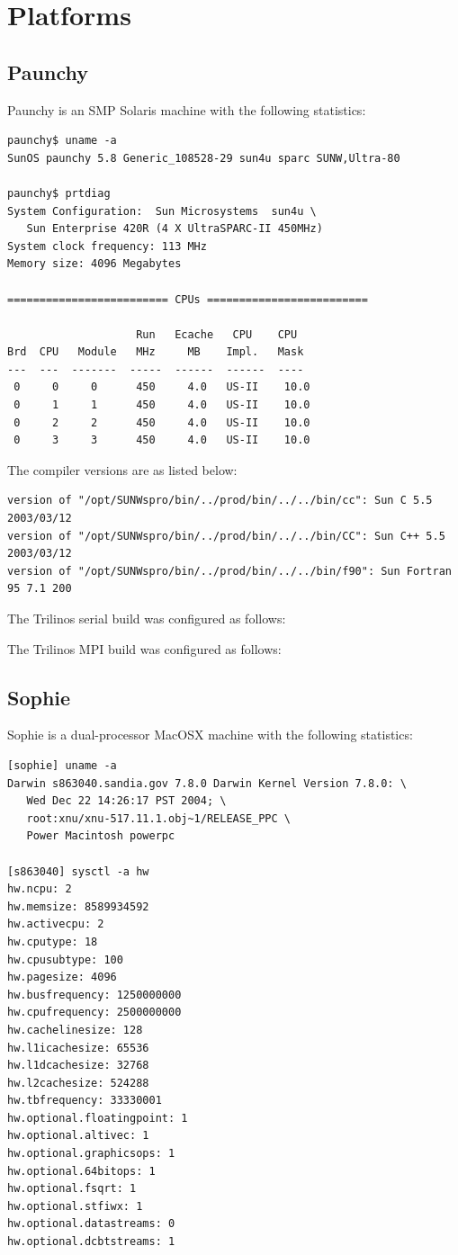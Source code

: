 \documentclass[10pt]{article}
\begin{document}
\section{Platforms}

\subsection{Paunchy}

Paunchy is an SMP Solaris machine with the following statistics:
\begin{verbatim}
paunchy$ uname -a
SunOS paunchy 5.8 Generic_108528-29 sun4u sparc SUNW,Ultra-80

paunchy$ prtdiag
System Configuration:  Sun Microsystems  sun4u \
   Sun Enterprise 420R (4 X UltraSPARC-II 450MHz)
System clock frequency: 113 MHz
Memory size: 4096 Megabytes

========================= CPUs =========================

                    Run   Ecache   CPU    CPU
Brd  CPU   Module   MHz     MB    Impl.   Mask
---  ---  -------  -----  ------  ------  ----
 0     0     0      450     4.0   US-II    10.0
 0     1     1      450     4.0   US-II    10.0
 0     2     2      450     4.0   US-II    10.0
 0     3     3      450     4.0   US-II    10.0
\end{verbatim}

The compiler versions are as listed below:
\begin{verbatim}
version of "/opt/SUNWspro/bin/../prod/bin/../../bin/cc": Sun C 5.5 2003/03/12
version of "/opt/SUNWspro/bin/../prod/bin/../../bin/CC": Sun C++ 5.5 2003/03/12
version of "/opt/SUNWspro/bin/../prod/bin/../../bin/f90": Sun Fortran 95 7.1 200
\end{verbatim}

The Trilinos serial build was configured as follows:


The Trilinos MPI build was configured as follows:



\subsection{Sophie}

Sophie is a dual-processor MacOSX machine with the following statistics:
\begin{verbatim}
[sophie] uname -a
Darwin s863040.sandia.gov 7.8.0 Darwin Kernel Version 7.8.0: \
   Wed Dec 22 14:26:17 PST 2004; \
   root:xnu/xnu-517.11.1.obj~1/RELEASE_PPC \
   Power Macintosh powerpc

[s863040] sysctl -a hw
hw.ncpu: 2
hw.memsize: 8589934592
hw.activecpu: 2
hw.cputype: 18
hw.cpusubtype: 100
hw.pagesize: 4096
hw.busfrequency: 1250000000
hw.cpufrequency: 2500000000
hw.cachelinesize: 128
hw.l1icachesize: 65536
hw.l1dcachesize: 32768
hw.l2cachesize: 524288
hw.tbfrequency: 33330001
hw.optional.floatingpoint: 1
hw.optional.altivec: 1
hw.optional.graphicsops: 1
hw.optional.64bitops: 1
hw.optional.fsqrt: 1
hw.optional.stfiwx: 1
hw.optional.datastreams: 0
hw.optional.dcbtstreams: 1
\end{verbatim}
\end{document}
